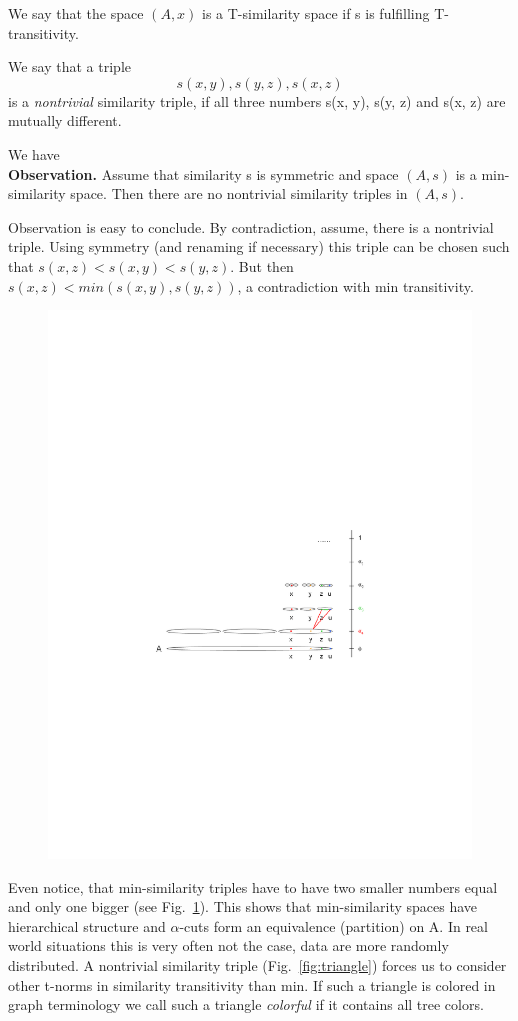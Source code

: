 We say that the space $(A,x)$ is a T-similarity space if s is fulfilling T-transitivity.

We say that a triple
\begin{displaymath}
s(x,y), s(y,z), s(x,z)
\end{displaymath}
is a \emph{nontrivial} similarity triple, if all three numbers s(x, y), s(y, z) and s(x, z) are mutually different.

We have
\\\textbf{Observation.} Assume that similarity s is symmetric and space $(A,s)$ is a min-similarity space. Then there are no nontrivial similarity triples in $(A,s)$. 

     Observation is easy to conclude. By contradiction, assume, there is a nontrivial triple. Using symmetry (and renaming if necessary) this triple can be chosen such that  $s(x, z) < s(x, y) < s(y, z)$. But then $s(x, z) < min(s(x, y), s(y, z))$, a contradiction with min transitivity.

\begin{figure}[!ht]
	\centering
		\includegraphics[width=0.8\hsize]{img/min_similarity}
	\caption{} \label{fig:alpha}
\end{figure}
     
      Even notice, that min-similarity triples have to have two smaller numbers equal and only one bigger (see Fig.~\ref{fig:alpha}). This shows that min-similarity spaces have hierarchical structure and $\alpha$-cuts form an equivalence (partition) on A. In real world situations this is very often not the case, data are more randomly distributed. A nontrivial similarity triple (Fig.~\ref{fig:triangle}) forces us to consider other t-norms in similarity transitivity than min. If such a triangle is colored in graph terminology we call such a triangle \emph{colorful} if it contains all tree colors. 

